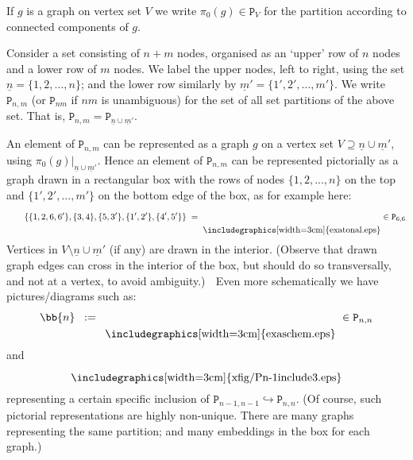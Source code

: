 \documentclass[reqno,10pt,a4paper]{amsart}
\newcommand{\rb}[2]{\raisebox{#1}{#2}}
\newcommand{\ig}{\includegraphics}
\newcommand{\beq}{\begin{equation}}
\newcommand{\eq}{\end{equation}}
\newcommand{\red}[1]{\textcolor{red}{#1}}
\newcommand{\ppm}[1]{\red{#1}}
\newcommand{\rmP}{{\mathtt P}} %
\begin{document}
If $g$ is a graph on vertex set  $V$ we write $\pi_0(g) \in \rmP_V$ for the partition according to connected components of $g$. 

\mdef  \label{pa:Pn}
Consider a set consisting of 
$n+m$ nodes, 
organised as
an `upper' row of $n$ nodes and a lower row of $m$ nodes.
We label the upper nodes, left to right, 
using the set 
$\underline{n} = \{1,2,\dots,n\}$; 
and the lower row similarly by 
$\underline{m}' = \{1',2',\dots,m'\}$. 
%
We write $\rmP_{n,m}$ 
(or $\rmP_{nm} $ if $nm$ is unambiguous)
for the set of all set partitions of the above set.
That is, 
$\rmP_{n,m} = \rmP_{ \underline{n} \cup \underline{m}' } $. 


\newcommand{\piz}{\pi_0}  %


\mdef 
An element of $\rmP_{n,m}$ can be represented 
as a graph $g$ on a vertex set  $V \supseteq \underline{n} \cup \underline{m}' $, 
using $\pi_0(g)|_{  \underline{n} \cup \underline{m}' }$. 
Hence an element of $\rmP_{n,m}$ can be represented 
pictorially
as a graph drawn 
in a rectangular box with the rows of nodes 
$\{ 1,2,...,n\}$ 
on the top and 
$\{ 1',2',...,m'\}$
on the
bottom edge of the box,
as for example here:
\beq 
\qquad 
\{\{ 1,2,6,6'\},\{ 3,4 \}, \{ 5,3'\}, \{ 1',2'\},\{ 4',5'\}\} 
\; = \; 
\rb{-.21in}{\ig[width=3cm]{exatonal.eps}}
\in \rmP_{6,6}
\eq 
Vertices 
in $V\setminus \underline{n} \cup \underline{m}'$ 
(if any) are  %
drawn in the interior. 
(Observe that drawn graph edges can cross in the interior of the box, but 
should  %
do so transversally, 
and not at a vertex, 
to avoid ambiguity.)
 $\; $ %
Even more schematically we have pictures/diagrams such as:
\beq\label{bn} 
\bb{n} \; 
\; := \; \;
\rb{-.21in}{\ig[width=3cm]{exaschem.eps} }\in\rmP_{n,n}
\eq
%
and
\[ 
\rb{-.02in}{\ig[width=3cm]{xfig/Pn-1include3.eps}}
\]
representing a certain specific inclusion of $\rmP_{n-1,n-1} \hookrightarrow \rmP_{n,n}$. 
%
%
(Of course, such pictorial representations are highly non-unique.
There are many graphs representing the same partition; and many 
embeddings in the box for each graph.)
%
\end{document}
